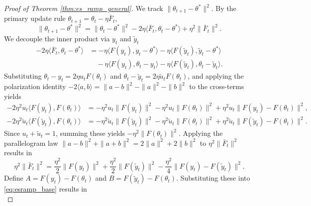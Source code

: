 \documentclass[10pt,a4paper]{amsart}
\begin{document}
\begin{proof}[Proof of Theorem \ref{thm:es_ramp_general}]
We track $\|\theta_{t+1} - \theta^*\|^2$. By the primary update rule $\theta_{t+1} = \theta_t - \eta \bar{F}_t$,
\begin{equation} \label{eq:esramp_base}
\|\theta_{t+1} - \theta^*\|^2 = \|\theta_t - \theta^*\|^2 - 2\eta \langle \bar{F}_t, \theta_t - \theta^* \rangle + \eta^2 \|\bar{F}_t\|^2.
\end{equation}
We decouple the inner product via $y_t$ and $\tilde{y}_t$
\begin{equation}
\begin{aligned}
-2\eta \langle \bar{F}_t, \theta_t - \theta^* \rangle &= -\eta \langle F(y_t), y_t - \theta^* \rangle - \eta \langle F(\tilde{y}_t), \tilde{y}_t - \theta^* \rangle \\
&\quad - \eta \langle F(y_t), \theta_t - y_t \rangle - \eta \langle F(\tilde{y}_t), \theta_t - \tilde{y}_t \rangle.
\end{aligned}
\end{equation}
Substituting $\theta_t - y_t = 2\eta u_t F(\theta_t)$ and $\theta_t - \tilde{y}_t = 2\eta \tilde{u}_t F(\theta_t)$, and applying the polarization identity $-2\langle a, b \rangle = \|a-b\|^2 - \|a\|^2 - \|b\|^2$ to the cross-terms yields
\begin{equation}
\begin{aligned}
-2\eta^2 u_t \langle F(y_t), F(\theta_t) \rangle &= -\eta^2 u_t \|F(y_t)\|^2 - \eta^2 u_t \|F(\theta_t)\|^2 + \eta^2 u_t \|F(y_t) - F(\theta_t)\|^2, \\
-2\eta^2 \tilde{u}_t \langle F(\tilde{y}_t), F(\theta_t) \rangle &= -\eta^2 \tilde{u}_t \|F(\tilde{y}_t)\|^2 - \eta^2 \tilde{u}_t \|F(\theta_t)\|^2 + \eta^2 \tilde{u}_t \|F(\tilde{y}_t) - F(\theta_t)\|^2.
\end{aligned}
\end{equation}
Since $u_t + \tilde{u}_t = 1$, summing these yields $-\eta^2 \|F(\theta_t)\|^2$. Applying the parallelogram law $\|a-b\|^2+\|a+b\|^2 = 2 \|a\|^2 + 2 \|b\|^2$ to $\eta^2 \|\bar{F}_t\|^2$ results in
\begin{equation}
\eta^2 \|\bar{F}_t\|^2 = \frac{\eta^2}{2}\|F(y_t)\|^2 + \frac{\eta^2}{2}\|F(\tilde{y}_t)\|^2 - \frac{\eta^2}{4}\|F(y_t) - F(\tilde{y}_t)\|^2.
\end{equation}
Define $A = F(y_t) - F(\theta_t)$ and $B = F(\tilde{y}_t) - F(\theta_t)$. Substituting these into \eqref{eq:esramp_base} results in
\begin{equation} \label{eq:esramp_grouped3}

\end{equation}
\end{proof}
\end{document}
